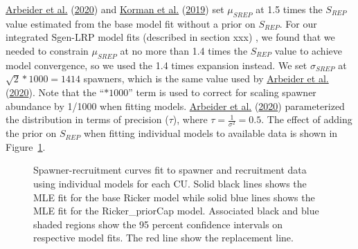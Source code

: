 \documentclass[11pt]{book}
\begin{document}
\protect\hyperlink{ref-arbeiderInteriorFraserCoho2020}{Arbeider et al.} (\protect\hyperlink{ref-arbeiderInteriorFraserCoho2020}{2020}) and \protect\hyperlink{ref-kormanEvaluationFrameworkAssessing2019}{Korman et al.} (\protect\hyperlink{ref-kormanEvaluationFrameworkAssessing2019}{2019}) set \(\mu_{SREP}\) at 1.5 times the \(S_{REP}\) value estimated from the base model fit without a prior on \(S_{REP}\). For our integrated Sgen-LRP model fits (described in section xxx) , we found that we needed to constrain \(\mu_{SREP}\) at no more than 1.4 times the \(S_{REP}\) value to achieve model convergence, so we used the 1.4 times expansion instead. We set \(\sigma_{SREP}\) at \(\sqrt{2} * 1000 = 1414\) spawners, which is the same value used by \protect\hyperlink{ref-arbeiderInteriorFraserCoho2020}{Arbeider et al.} (\protect\hyperlink{ref-arbeiderInteriorFraserCoho2020}{2020}). Note that the ``\(* 1000\)'' term is used to correct for scaling spawner abundance by 1/1000 when fitting models. \protect\hyperlink{ref-arbeiderInteriorFraserCoho2020}{Arbeider et al.} (\protect\hyperlink{ref-arbeiderInteriorFraserCoho2020}{2020}) parameterized the distribution in terms of precision (\(\tau\)), where \(\tau = \frac{1}{\sigma^2} = 0.5\). The effect of adding the prior on \(S_{REP}\) when fitting individual models to available data is shown in Figure~\ref{fig:coho-SR-fit}.
\begin{figure}[htb]

{\centering {} 

}

\caption{Spawner-recruitment curves fit to spawner and recruitment data using individual models for each CU. Solid black lines shows the MLE fit for the base Ricker model while solid blue lines shows the MLE fit for the Ricker\_priorCap model.  Associated black and blue shaded regions show the 95 percent confidence intervals on respective model fits. The red line show the replacement line.}\label{fig:coho-SR-fit}
\end{figure}
\end{document}
